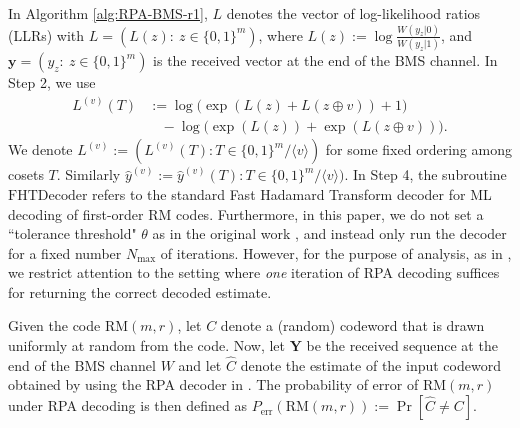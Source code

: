 \documentclass[conference,letterpaper]{IEEEtran}
\begin{document}
 In Algorithm \ref{alg:RPA-BMS-r1}, $L$ denotes the vector of log-likelihood ratios (LLRs) with $L = (L(z):\ z\in \{0,1\}^m)$, where $L(z):=\log \frac{W(y_z|0)}{W(y_z|1)}$, and $\mathbf{y} = (y_z:\  z\in \{0,1\}^m)$ is the received vector at the end of the BMS channel. In Step 2, we use
 \begin{align*}
     L^{(v)}(T)&:=\log\big(\exp(L(z){+}L(z\oplus v))+1\big)\\
                &\ \ \ \ -\log\big(\exp(L(z))+\exp(L(z\oplus v))\big).
  \end{align*}
  We denote $L^{(v)} := (L^{(v)}(T): T \in \{0,1\}^m / \langle v\rangle)$ for some fixed ordering among cosets $T$. Similarly $\widehat{y}^{(v)} := \widehat{y}^{(v)}(T) : T \in \{0,1\}^m / \langle v\rangle)$.
  In Step 4, the subroutine $\mathrm{FHTDecoder}$ refers to the standard Fast Hadamard Transform decoder \cite{fht2,fht} for ML decoding of first-order RM codes.
 Furthermore, in this paper, we do not set a ``tolerance threshold" $\theta$ as in the original work \cite{rpa}, and instead only run the decoder for a fixed number $N_\text{max}$ of iterations. However, for the purpose of analysis, as in \cite{rpa-analysis-isit}, we restrict attention to the setting where \emph{one} iteration of RPA decoding suffices for returning the correct decoded estimate.

 Given the code RM$(m,r)$, let $C$ denote a (random) codeword that is drawn uniformly at random from the code. Now, let $\mathbf{Y}$ be the received sequence at the end of the BMS channel $W$ and let $\widehat{C}$ denote the estimate of the input codeword obtained by using the RPA decoder in \cite[Alg. 3]{rpa}. The probability of error of RM$(m,r)$ under RPA decoding is then defined as $P_\text{err}(\text{RM}(m,r)):=\Pr\left[\widehat{C}\neq C\right]$.
\end{document}
